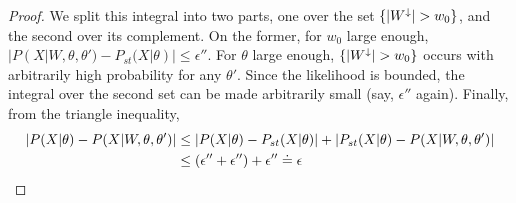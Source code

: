 \begin{proof}
We split this integral into two parts, one over the set $\{{|W^\downarrow}| > w_0\}$, and 
the second over its complement. On the former, for $w_0$ large enough, 
$|P(X |W, \theta, \theta')-P_{st}(X|\theta)|
\le \epsilon''$. %
For $\theta$ large enough, $\{{|W^\downarrow}| > w_0\}$ occurs
with arbitrarily high probability for any $\theta'$. Since the likelihood is bounded, the
integral over the second set can be made arbitrarily small (say, $\epsilon''$ again). 
Finally, from the triangle
inequality,
\begin{align*}
|P(X | \theta) - P(X | W, \theta, \theta')| &\leq |P(X | \theta) -P_{st}(X | \theta) | + | P_{st}(X | \theta) -  P(X | W, \theta, \theta')|\\
       & \leq (\epsilon'' + \epsilon'') + \epsilon'' \doteq \epsilon
\end{align*}
\end{proof}

